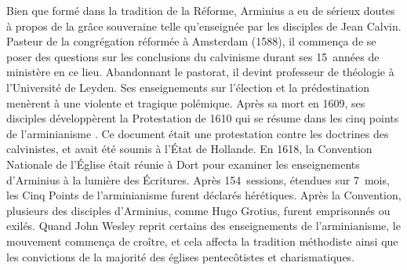 \begin{specialpar}{}
Bien que formé dans la tradition de la Réforme, Arminius a eu de sérieux doutes
 à propos de \og la grâce souveraine \fg{}  telle qu'enseignée
 par les disciples de Jean Calvin. Pasteur de la congrégation réformée à Amsterdam (1588),
 il commença de se poser des questions sur les conclusions du calvinisme
 durant ses 15~années de ministère en ce lieu. Abandonnant le pastorat,
 il devint professeur de théologie à l'Université de Leyden.
 Ses enseignements sur l'élection et la prédestination menèrent à une violente
 et tragique polémique. Après sa mort en 1609, ses disciples développèrent la Protestation
 de 1610 qui se résume dans les \og cinq points de l'arminianisme \fg{}.
 Ce document était une protestation contre les doctrines des calvinistes,
 et avait été soumis à l'État de Hollande. En 1618, la Con\-vention Nationale
 de l'Église était réunie à Dort pour examiner les enseignements d'Arminius
 à la lumière des Écritures. Après 154~sessions, étendues sur
 7~mois,
 les Cinq Points de l'arminianisme furent déclarés hérétiques.
 Après la
 Con\-ven\-tion, plusieurs des disciples d'Ar\-mi\-nius, comme Hugo Grotius,
 furent emprisonnés ou exilés. Quand John Wesley reprit certains des enseignements
 de l'armi\-nia\-nisme, le mouvement commença de croître, et cela affecta la tradition méthodiste
 ainsi que les convictions de la majorité des églises pentecôtistes et charismatiques.
\end{specialpar}


\closeintro

